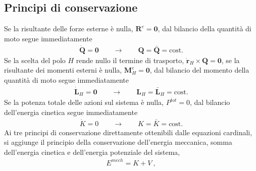 \documentclass[letterpaper,10pt,english]{jupyterBook}
\begin{document}
\subsection{Principi di conservazione}
\label{\detokenize{ch/dynamics-eom:principi-di-conservazione}}
\sphinxAtStartPar
{} Se la risultante delle forze esterne è nulla, \(\mathbf{R}^e = \mathbf{0}\), dal bilancio della quantità di moto segue immediatamente
\begin{equation*}
\begin{split}\dot{\mathbf{Q}} = \mathbf{0} \qquad \rightarrow \qquad \mathbf{Q} = \bar{\mathbf{Q}} = \text{cost.}\end{split}
\end{equation*}
\sphinxAtStartPar
{} Se la scelta del polo \(H\) rende nullo il termine di trasporto, \(\dot{\mathbf{r}}_H \times \mathbf{Q} = \mathbf{0}\), se la risultante dei momenti esterni è nulla, \(\mathbf{M}^e_H = \mathbf{0}\), dal bilancio del momento della quantità di moto segue immediatamente
\begin{equation*}
\begin{split}\dot{\mathbf{L}}_H = \mathbf{0} \qquad \rightarrow \qquad \mathbf{L}_H = \bar{\mathbf{L}}_H = \text{cost.}\end{split}
\end{equation*}
\sphinxAtStartPar
{} Se la potenza totale delle azioni sul sistema è nulla, \(P^{tot} = 0\), dal bilancio dell’energia cinetica segue immediatamente
\begin{equation*}
\begin{split}\dot{K} = 0 \qquad \rightarrow \qquad K = \bar{K} = \text{cost.}\end{split}
\end{equation*}
\sphinxAtStartPar
{} Ai tre principi di conservazione direttamente ottenibili dalle equazioni cardinali, si aggiunge il principio della conservazione dell’energia meccanica, somma dell’energia cinetica e dell’energia potenziale del sistema,
\begin{equation*}
\begin{split}E^{mech} = K + V \ ,\end{split}
\end{equation*}
\end{document}

